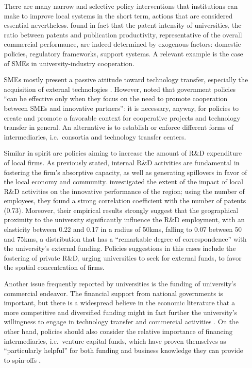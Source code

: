 There are many narrow and selective policy interventions that institutions can make to improve local systems in the short term, actions that are considered essential nevertheless. \citet{Tijssen2006} found in fact that the patent intensity of universities, the ratio between patents and publication productivity, representative of the overall commercial performance, are indeed determined by exogenous factors: domestic policies, regulatory frameworks, support systems. A relevant example is the case of SMEs in university-industry cooperation.

SMEs mostly present a passive attitude toward technology transfer, especially the acquisition of external technologies \citep{Yusuf2008}. However, \citet{Zeng2010} noted that government policies \enquote{can be effective only when they focus on the need to promote cooperation between SMEs and innovative partners}: it is necessary, anyway, for policies to create and promote a favorable context for cooperative projects and technology transfer in general. An alternative is to establish or enforce different forms of intermediaries, i.e.\ consortia and technology transfer centers. 

Similar in spirit are policies aiming to increase the amount of R\&D expenditure of local firms. As previously stated, internal R\&D activities are fundamental in fostering the firm's absorptive capacity, as well as generating spillovers in favor of the local economy and community. \citet{Fritsch2007} investigated the extent of the impact of local R\&D activities on the innovative performance of the region; using the number of employees, they found a strong correlation coefficient with the number of patents (0.73). Moreover, their empirical results strongly suggest that the geographical proximity to the university significantly influence the R\&D employment, with an elasticity between 0.22 and 0.17 in a radius of 50kms, falling to 0.07 between 50 and 75kms, a distribution that has a \enquote{remarkable degree of correspondence} with the university's external funding. Policies suggestions in this cases include the fostering of private R\&D, urging universities to seek for external funds, to favor the spatial concentration of firms. 

Another issue frequently reported by universities is the funding of university's commercial endeavor. The financial support from national governments is important, but there is a widespread believe in the economic literature that a more competitive and diversified funding might in fact further the university's willingness to engage in technology transfer and commercial activities \citep{Rasmussen2006}. On the other hand, policies should also consider the relative importance of financing intermediaries, i.e.\ venture capital funds, which have proven themselves as \enquote{particularly helpful} for both funding and business knowledge they can provide to spin-offs \citep{Yusuf2008}.

